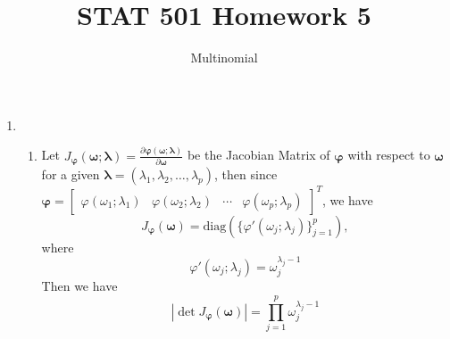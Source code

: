 \documentclass{article}
\begin{document}
	

	
	\title{STAT 501 Homework 5}
	\author{Multinomial}
	\maketitle
	
	\begin{enumerate}[leftmargin = 0 em, label = \arabic*., font = \bfseries]
	\item
	\begin{enumerate}
		\item 
		Let $J_{\bm \varphi} (\bm \omega; \bm \lambda) = \frac{\partial \bm \varphi (\bm \omega; \bm \lambda)}{\partial \bm \omega} $ be the Jacobian Matrix of $\bm \varphi$ with respect to $\bm \omega$ for a given $\bm \lambda = (\lambda_1, \lambda_2, \ldots, \lambda_p)$, then since $\bm \varphi = \begin{bmatrix}
			\varphi(\omega_1; \lambda_1) & \varphi(\omega_2; \lambda_2) & \cdots & \varphi(\omega_p; \lambda_p)
		\end{bmatrix}^T$, we have
		\[J_{\bm \varphi}(\bm \omega) = \mathrm{diag}\left(\{\varphi'(\omega_j; \lambda_j)\}_{j=1}^p\right),\]
		where
		\[\varphi'(\omega_j; \lambda_j) = \omega_j^{\lambda_j - 1}\]
		Then we have
		\[\left|\det J_{\bm \varphi}(\bm \omega)\right| = \prod_{j=1}^p \omega_j^{\lambda_j - 1}\]


\end{enumerate}
\end{enumerate}
\end{document}
